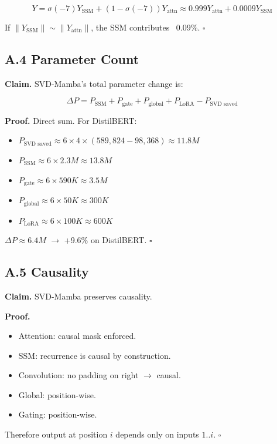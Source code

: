 \[
Y = \sigma(-7) Y_\text{SSM} + (1 - \sigma(-7)) Y_\text{attn} \approx 0.999 Y_\text{attn} + 0.0009 Y_\text{SSM}
\]

If $\|Y_\text{SSM}\| \sim \|Y_\text{attn}\|$, the SSM contributes ~0.09\%. $\square$

\subsection{A.4 Parameter Count}

\textbf{Claim.} SVD-Mamba's total parameter change is:

\[
\Delta P = P_\text{SSM} + P_\text{gate} + P_\text{global} + P_\text{LoRA} - P_\text{SVD saved}
\tag{A.2}
\]

\textbf{Proof.} Direct sum. For DistilBERT:

\begin{itemize}
\item $P_\text{SVD saved} \approx 6 \times 4 \times (589,824 - 98,368) \approx 11.8M$
\item $P_\text{SSM} \approx 6 \times 2.3M \approx 13.8M$
\item $P_\text{gate} \approx 6 \times 590K \approx 3.5M$
\item $P_\text{global} \approx 6 \times 50K \approx 300K$
\item $P_\text{LoRA} \approx 6 \times 100K \approx 600K$

\end{itemize}
$\Delta P \approx 6.4M$ $\to$ +9.6\% on DistilBERT. $\square$

\subsection{A.5 Causality}

\textbf{Claim.} SVD-Mamba preserves causality.

\textbf{Proof.} 
\begin{itemize}
\item Attention: causal mask enforced.
\item SSM: recurrence is causal by construction.
\item Convolution: no padding on right $\to$ causal.
\item Global: position-wise.
\item Gating: position-wise.

\end{itemize}
Therefore output at position $i$ depends only on inputs $1..i$. $\square$

